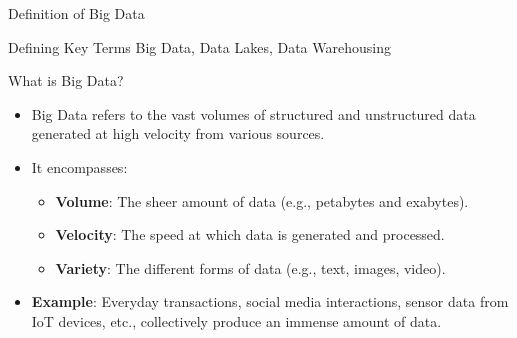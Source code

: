 \documentclass[aspectratio=169]{beamer}
\begin{document}
\begin{frame}[fragile]{Definition of Big Data}
    \begin{block}{Defining Key Terms}
        Big Data, Data Lakes, Data Warehousing
    \end{block}
\end{frame}

\begin{frame}[fragile]{What is Big Data?}
    \begin{itemize}
        \item Big Data refers to the vast volumes of structured and unstructured data generated at high velocity from various sources.
        \item It encompasses:
        \begin{itemize}
            \item \textbf{Volume}: The sheer amount of data (e.g., petabytes and exabytes).
            \item \textbf{Velocity}: The speed at which data is generated and processed.
            \item \textbf{Variety}: The different forms of data (e.g., text, images, video).
        \end{itemize}
        \item \textbf{Example}: Everyday transactions, social media interactions, sensor data from IoT devices, etc., collectively produce an immense amount of data.
    \end{itemize}
\end{frame}
\end{document}
